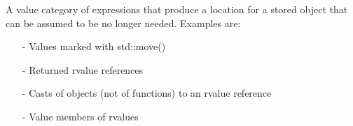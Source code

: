 



A value category of expressions that produce a location for a stored object that can be assumed to be no longer needed. Examples are:

\begin{itemize}
\item [-]
Values marked with std::move()

\item [-]
Returned rvalue references

\item [-]
Casts of objects (not of functions) to an rvalue reference

\item [-]
Value members of rvalues
\end{itemize}















